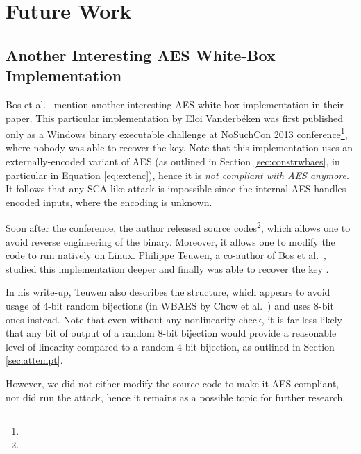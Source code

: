 \chapter{Future Work}
\label{chap:future}

\section{Another Interesting AES White-Box Implementation}
\label{sec:magicimpl}

Bos et al.\ \cite{bos2015differential} mention another interesting AES white-box implementation in their paper. This particular implementation by Eloi Vanderbéken was first published only as a Windows binary executable challenge at NoSuchCon 2013 conference\footnote{}, where nobody was able to recover the key. Note that this implementation uses an externally-encoded variant of AES (as outlined in Section \ref{sec:constrwbaes}, in particular in Equation \ref{eq:extenc}), hence it is {\em not compliant with AES anymore}. It follows that any SCA-like attack is impossible since the internal AES handles encoded inputs, where the encoding is unknown.

Soon after the conference, the author released source codes\footnote{}, which allows one to avoid reverse engineering of the binary. Moreover, it allows one to modify the code to run natively on Linux. Philippe Teuwen, a co-author of Bos et al.\ \cite{bos2015differential}, studied this implementation deeper and finally was able to recover the key \cite{teuwen2015nscwriteups}.

In his write-up, Teuwen also describes the structure, which appears to avoid usage of $4$-bit random bijections (in WBAES by Chow et al.\ \cite{chow2002aes}) and uses $8$-bit ones instead. Note that even without any nonlinearity check, it is far less likely that any bit of output of a random $8$-bit bijection would provide a reasonable level of linearity compared to a random $4$-bit bijection, as outlined in Section \ref{sec:attempt}.

However, we did not either modify the source code to make it AES-compliant, nor did run the attack, hence it remains as a possible topic for further research.

